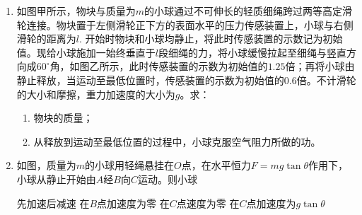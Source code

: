 \begin{enumerate}[leftmargin=0em]
\item 
{}
如图甲所示，物块与质量为$ m $的小球通过不可伸长的轻质细绳跨过两等高定滑轮连接。物块置于左侧滑轮正下方的表面水平的压力传感装置上，小球与右侧滑轮的距离为$ l $. 开始时物块和小球均静止，将此时传感装置的示数记为初始值。现给小球施加一始终垂直于$ l $段细绳的力，将小球缓慢拉起至细绳与竖直方向成$ 60 ^{ \circ } $角，如图乙所示，此时传感装置的示数为初始值的$ 1.25 $倍；再将小球由静止释放，当运动至最低位置时，传感装置的示数为初始值的$ 0.6 $倍。不计滑轮的大小和摩擦，重力加速度的大小为$ g $。求：
\begin{enumerate}
\renewcommand{\labelenumi}{\arabic{enumi}.}
\item
物块的质量；
\item 
从释放到运动至最低位置的过程中，小球克服空气阻力所做的功。 


\end{enumerate}
\begin{figure}[h!]
\flushright

\end{figure}



\newpage

\item 
{}
如图，质量为$ m $的小球用轻绳悬挂在$ O $点，在水平恒力$ F=mg \tan \theta $作用下，小球从静止开始由$ A $经$ B $向$ C $运动。则小球  




\begin{minipage}[h!]{0.7\linewidth}
\vspace{0.3em}
\fourchoices
{先加速后减速}
{在$ B $点加速度为零}
{在$ C $点速度为零}
{在$ C $点加速度为$ g \tan \theta $}
\vspace{0.3em}
\end{minipage}
\hfill
\begin{minipage}[h!]{0.3\linewidth}
\flushright
\vspace{0.3em}

\vspace{0.3em}
\end{minipage}


\end{enumerate}

